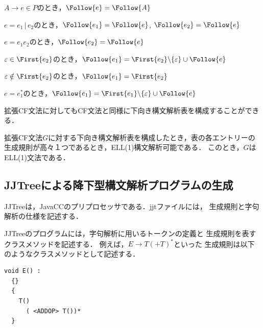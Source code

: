 \documentclass[dvipdfmx,a4j]{jbook}
\begin{document}
\begin{Def}
  $A\rightarrow e\in P$のとき，$\Follow{e}=\Follow{A}$
  \begin{list}{}{}
    \item $e=e_1\,|\,e_2$のとき，$\Follow{e_1}=\Follow{e}$, $\Follow{e_2}=\Follow{e}$
    \item $e=e_1 e_2$のとき，$\Follow{e_2}=\Follow{e}$
    \begin{list}{}{}
      \item $\varepsilon\in\First{e_2}$のとき，$\Follow{e_1}=\First{e_2}\backslash\{\varepsilon\}\cup\Follow{e}$
      \item $\varepsilon\notin\First{e_2}$のとき，$\Follow{e_1}=\First{e_2}$
    \end{list}
    \item $e=e_1^\ast$のとき，$\Follow{e_1}=\First{e_1}\backslash\{\varepsilon\}\cup\Follow{e}$
  \end{list}

\end{Def}

拡張CF文法に対してもCF文法と同様に下向き構文解析表を構成することができる．

\begin{Def}
  拡張CF文法$G$に対する下向き構文解析表を構成したとき，表の各エントリーの
  生成規則が高々１つであるとき，ELL(1)構文解析可能である．
  このとき，$G$はELL(1)文法である．
\end{Def}

\subsection{JJTreeによる降下型構文解析プログラムの生成}

JJTreeは，JavaCCのプリプロセッサである．jjtファイルには，
生成規則と字句解析の仕様を記述する．

JJTreeのプログラムには，字句解析に用いるトークンの定義と
生成規則を表すクラスメソッドを記述する．
例えば，$E\rightarrow T(\texttt{+}T)^\ast$といった
生成規則は以下のようなクラスメソッドとして記述する．

\begin{center}
\begin{minipage}{0.5\textwidth}
\begin{Verbatim}[frame=single]
  void E() :
  {}
  {
    T()
      ( <ADDOP> T())*
  }
\end{Verbatim}
\end{minipage}
\end{center}
\end{document}
